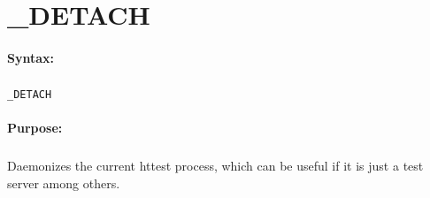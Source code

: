 
\newpage
\section{\_DETACH}
\label{cmd:_DETACH}

\paragraph{Syntax:}
\subparagraph{}
\texttt{\_DETACH}

\paragraph{Purpose:}
\subparagraph{}
Daemonizes the current httest process, which can be 
useful if it is just a test server among others.